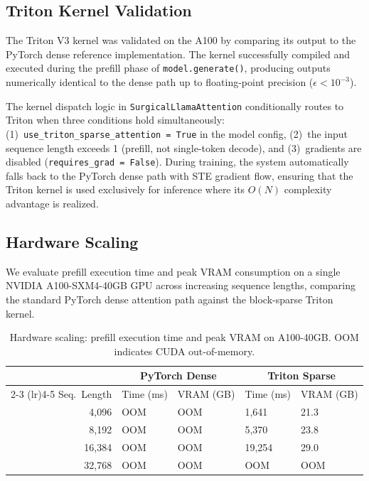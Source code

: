 \documentclass[11pt,a4paper]{article}
\begin{document}
\subsection{Triton Kernel Validation}

The Triton V3 kernel was validated on the A100 by comparing its output to the PyTorch dense reference implementation. The kernel successfully compiled and executed during the prefill phase of \texttt{model.generate()}, producing outputs numerically identical to the dense path up to floating-point precision ($\epsilon < 10^{-3}$).

The kernel dispatch logic in \texttt{SurgicalLlamaAttention} conditionally routes to Triton when three conditions hold simultaneously: (1)~\texttt{use\_triton\_sparse\_attention = True} in the model config, (2)~the input sequence length exceeds 1 (prefill, not single-token decode), and (3)~gradients are disabled (\texttt{requires\_grad = False}). During training, the system automatically falls back to the PyTorch dense path with STE gradient flow, ensuring that the Triton kernel is used exclusively for inference where its $O(N)$ complexity advantage is realized.

\subsection{Hardware Scaling}

We evaluate prefill execution time and peak VRAM consumption on a single NVIDIA A100-SXM4-40GB GPU across increasing sequence lengths, comparing the standard PyTorch dense attention path against the block-sparse Triton kernel.

\begin{table}[h]
\centering
\caption{Hardware scaling: prefill execution time and peak VRAM on A100-40GB. OOM indicates CUDA out-of-memory.}
\label{tab:hardware}
\begin{tabular}{@{}rllll@{}}
\toprule
& \multicolumn{2}{c}{PyTorch Dense} & \multicolumn{2}{c}{Triton Sparse} \\
\cmidrule(lr){2-3} \cmidrule(lr){4-5}
Seq.\ Length & Time (ms) & VRAM (GB) & Time (ms) & VRAM (GB) \\
\midrule
4{,}096   & OOM & OOM & 1{,}641 & 21.3 \\
8{,}192   & OOM & OOM & 5{,}370 & 23.8 \\
16{,}384  & OOM & OOM & 19{,}254 & 29.0 \\
32{,}768  & OOM & OOM & OOM & OOM \\
\bottomrule
\end{tabular}
\end{table}
\end{document}
